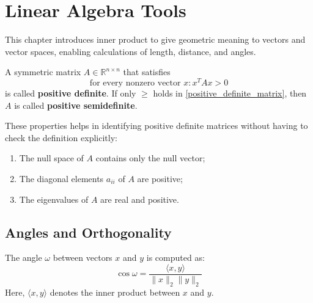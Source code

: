 \documentclass{article}
\begin{document}

\tableofcontents
\clearpage

\parindent 0pt

\section{Linear Algebra Tools}
This chapter introduces inner product to give geometric meaning to vectors and
vector spaces, enabling calculations of length, distance, and angles.

\begin{definition} 
    A symmetric matrix $A\in \mathbb{R}^{n\times n}$ that satisfies
    \begin{equation}\label{positive_definite_matrix}
        \text{for every nonzero vector }x:x^TAx>0
    \end{equation}    
    is called \textbf{positive definite}. If only $\geq$ holds in
    \ref{positive_definite_matrix}, then $A$ is called \textbf{positive
    semidefinite}.
\end{definition}
These properties helps in identifying positive definite matrices without
having to check the definition explicitly:
\begin{enumerate}
    \item The null space of $A$ contains only the null vector; 
    \item The diagonal elements $a_{ii}$ of $A$ are positive; 
    \item The eigenvalues of $A$ are real and positive.
\end{enumerate}
\subsection{Angles and Orthogonality}
The angle $\omega$ between vectors $x$ and $y$ is computed as:
$$\cos\omega=\frac{\langle x,y\rangle}{\lVert x\rVert_2 \lVert y\rVert_2}$$ 
Here, $\langle x,y\rangle$ denotes the inner product between $x$ and $y$.
\end{document}

